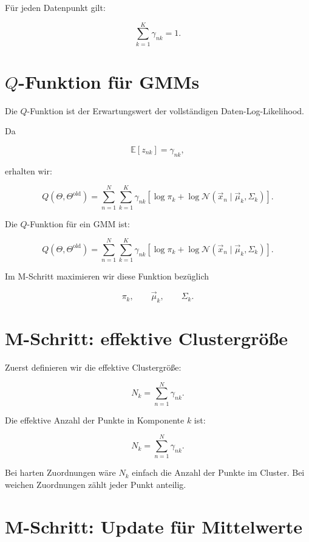 Für jeden Datenpunkt gilt:

\[
    \sum_{k=1}^{K}
    \gamma_{nk}=1.
\]

\section{\(Q\)-Funktion für GMMs}

Die \(Q\)-Funktion ist der Erwartungswert der vollständigen Daten-Log-Likelihood.

Da

\[
    \mathbb{E}[z_{nk}]
    =
    \gamma_{nk},
\]

erhalten wir:

\[
    Q(\Theta,\Theta^{\mathrm{old}})
    =
    \sum_{n=1}^{N}
    \sum_{k=1}^{K}
    \gamma_{nk}
    \left[
        \log \pi_k
        +
        \log
        \mathcal{N}(\vec{x}_n\mid\vec{\mu}_k,\Sigma_k)
    \right].
\]

\begin{definitionbox}
Die \(Q\)-Funktion für ein GMM ist:

\[
    Q(\Theta,\Theta^{\mathrm{old}})
    =
    \sum_{n=1}^{N}
    \sum_{k=1}^{K}
    \gamma_{nk}
    \left[
        \log \pi_k
        +
        \log
        \mathcal{N}(\vec{x}_n\mid\vec{\mu}_k,\Sigma_k)
    \right].
\]
\end{definitionbox}

Im M-Schritt maximieren wir diese Funktion bezüglich

\[
    \pi_k,
    \qquad
    \vec{\mu}_k,
    \qquad
    \Sigma_k.
\]

\section{M-Schritt: effektive Clustergröße}

Zuerst definieren wir die effektive Clustergröße:

\[
    N_k
    =
    \sum_{n=1}^{N}
    \gamma_{nk}.
\]

\begin{definitionbox}
Die effektive Anzahl der Punkte in Komponente \(k\) ist:

\[
    N_k
    =
    \sum_{n=1}^{N}
    \gamma_{nk}.
\]
\end{definitionbox}

Bei harten Zuordnungen wäre \(N_k\) einfach die Anzahl der Punkte im Cluster.
Bei weichen Zuordnungen zählt jeder Punkt anteilig.

\section{M-Schritt: Update für Mittelwerte}

